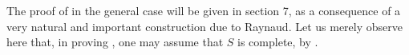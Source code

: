 The proof of  in the general case will be given in section 7, as a
consequence of a very natural and important construction due to
Raynaud.  Let us merely observe here that, in proving , one may
assume that $S$ is complete, by .
